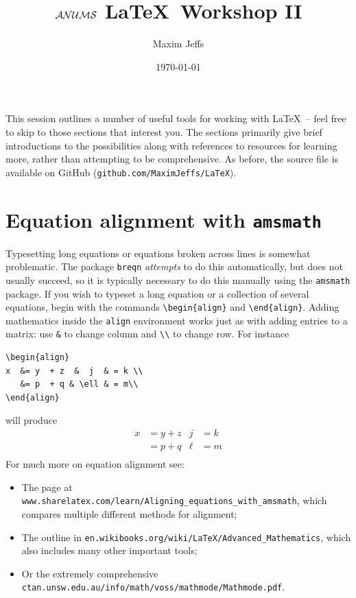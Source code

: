 \documentclass[11pt]{article}
\title{\textbf{$\mathcal{ANUMS}$ \LaTeX\ Workshop II}}
\author{Maxim Jeffs}
\date{\today}
\newcommand{\eqn}[1]{\begin{align*} #1 \end{align*}}
\begin{document}
\maketitle

This session outlines a number of useful tools for working with \LaTeX\ -- feel free to skip to those sections that interest you. The sections primarily give brief introductions to the possibilities along with references to resources for learning more, rather than attempting to be comprehensive. As before, the source file is available on GitHub (\verb$github.com/MaximJeffs/LaTeX$).

\section{Equation alignment with \texttt{amsmath}}

Typesetting long equations or equations broken across lines is somewhat problematic. The package \texttt{breqn} \textit{attempts} to do this automatically, but does not usually succeed, so it is typically necessary to do this manually using the \verb$amsmath$ package. If you wish to typeset a long equation or a collection of several equations, begin with the commands \verb$\begin{align}$ and \verb$\end{align}$. Adding mathematics inside the \texttt{align} environment works just as with adding entries to a matrix: use \verb$&$ to change column and \verb$\\$ to change row. For instance
\begin{verbatim}
\begin{align}
x  &= y  + z  &  j  & = k \\
   &= p  + q & \ell & = m\\
\end{align}
\end{verbatim}
will produce
\eqn{
x  &= y  + z  &  j  & = k \\
    & = p  + q  & \ell & = m\\
}
For much more on equation alignment see: 
\begin{itemize}
\item The page at \verb$www.sharelatex.com/learn/Aligning_equations_with_amsmath$, which compares multiple different methods for alignment;
\item The outline in \verb$en.wikibooks.org/wiki/LaTeX/Advanced_Mathematics$, which also includes many other important tools;
\item Or the extremely comprehensive \verb$ctan.unsw.edu.au/info/math/voss/mathmode/Mathmode.pdf$. 
\end{itemize} 
\end{document}
